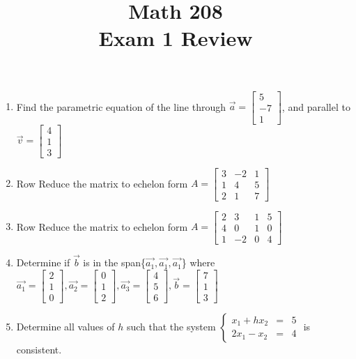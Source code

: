 \documentclass[12pt]{article}
\title{Math 208\\Exam 1 Review}
\date{}
\begin{document}
    \maketitle
    \begin{enumerate}
        \item Find the parametric equation of the line through $\vec{a}=\left[\begin{array}{c}5\\-7\\1\end{array}\right]$, and parallel to $\vec{v}=\left[\begin{array}{c}4\\1\\3\end{array}\right]$
        \item Row Reduce the matrix to echelon form $A=\left[\begin{array}{rrr}3&-2&1\\1&4&5\\2&1&7\end{array}\right]$
        \item Row Reduce the matrix to echelon form $A=\left[\begin{array}{rrrr}2&3&1&5\\4&0&1&0\\1&-2&0&4\end{array}\right]$
        \item Determine if $\vec{b}$ is in the span\{$\vec{a_1},\vec{a_1},\vec{a_1}$\} where\\ $\vec{a_1}=\left[\begin{array}{c}2\\1\\0\end{array}\right],\vec{a_2}=\left[\begin{array}{c}0\\1\\2\end{array}\right],\vec{a_3}=\left[\begin{array}{c}4\\5\\6\end{array}\right],\vec{b}=\left[\begin{array}{c}7\\1\\3\end{array}\right]$
        \item Determine all values of $h$ such that the system $\left\{\begin{array}{ccc}x_1+hx_2&=&5\\2x_1-x_2&=&4\end{array}\right.$ is consistent.

\end{enumerate}
\end{document}
